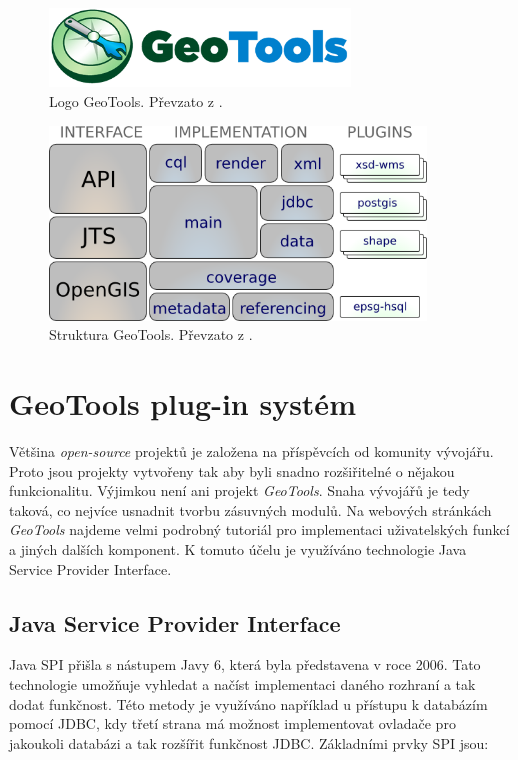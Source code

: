 	
\begin{figure}[h]
  \centering
  \includegraphics[width=8cm]{./pictures/7/geotools_logo.png}
  \caption{Logo GeoTools. Převzato z \cite{GeoTools}.}
  \label{fig:7-geotools}
\end{figure}
	
	
\begin{figure}[h]
  \centering
  \includegraphics[width=10cm]{./pictures/7/geotools_struktura.png}
  \caption{Struktura GeoTools. Převzato z \cite{GeoTools}.}
  \label{fig:7-geotools}
\end{figure}
	
	
	
	
\section{GeoTools plug-in systém}
	Většina \textit{open-source} projektů je založena na příspěvcích od komunity vývojářu. Proto jsou projekty vytvořeny tak aby byli snadno rozšiřitelné o nějakou funkcionalitu. Výjimkou není ani projekt \textit{GeoTools}. Snaha vývojářů je tedy taková, co nejvíce usnadnit tvorbu zásuvných modulů. Na webových stránkách \textit{GeoTools}\cite{GeoTools} najdeme velmi podrobný tutoriál pro implementaci uživatelských funkcí a jiných dalších komponent. K tomuto účelu je využíváno technologie Java Service Provider Interface.
	
\subsection{Java Service Provider Interface}
	Java SPI přišla s nástupem Javy 6, která byla představena v roce 2006. Tato technologie umožňuje vyhledat a načíst implementaci daného rozhraní a tak dodat funkčnost. Této metody je využíváno například u přístupu k databázím pomocí JDBC, kdy třetí strana má možnost implementovat ovladače pro jakoukoli databázi a tak rozšířit funkčnost JDBC. Základními prvky SPI jsou:
	
